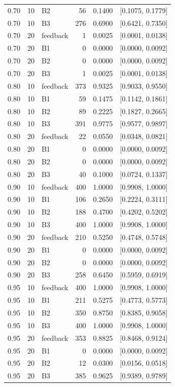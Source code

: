 \begin{longtable}{rrlrrl}
0.70 & 10 & B2 & 56 & 0.1400 & [0.1075, 0.1779]\\
0.70 & 10 & B3 & 276 & 0.6900 & [0.6421, 0.7350]\\
0.70 & 20 & feedback & 1 & 0.0025 & [0.0001, 0.0138]\\
0.70 & 20 & B1 & 0 & 0.0000 & [0.0000, 0.0092]\\
0.70 & 20 & B2 & 0 & 0.0000 & [0.0000, 0.0092]\\
0.70 & 20 & B3 & 1 & 0.0025 & [0.0001, 0.0138]\\
0.80 & 10 & feedback & 373 & 0.9325 & [0.9033, 0.9550]\\
0.80 & 10 & B1 & 59 & 0.1475 & [0.1142, 0.1861]\\
0.80 & 10 & B2 & 89 & 0.2225 & [0.1827, 0.2665]\\
0.80 & 10 & B3 & 391 & 0.9775 & [0.9577, 0.9897]\\
0.80 & 20 & feedback & 22 & 0.0550 & [0.0348, 0.0821]\\
0.80 & 20 & B1 & 0 & 0.0000 & [0.0000, 0.0092]\\
0.80 & 20 & B2 & 0 & 0.0000 & [0.0000, 0.0092]\\
0.80 & 20 & B3 & 40 & 0.1000 & [0.0724, 0.1337]\\
0.90 & 10 & feedback & 400 & 1.0000 & [0.9908, 1.0000]\\
0.90 & 10 & B1 & 106 & 0.2650 & [0.2224, 0.3111]\\
0.90 & 10 & B2 & 188 & 0.4700 & [0.4202, 0.5202]\\
0.90 & 10 & B3 & 400 & 1.0000 & [0.9908, 1.0000]\\
0.90 & 20 & feedback & 210 & 0.5250 & [0.4748, 0.5748]\\
0.90 & 20 & B1 & 0 & 0.0000 & [0.0000, 0.0092]\\
0.90 & 20 & B2 & 0 & 0.0000 & [0.0000, 0.0092]\\
0.90 & 20 & B3 & 258 & 0.6450 & [0.5959, 0.6919]\\
0.95 & 10 & feedback & 400 & 1.0000 & [0.9908, 1.0000]\\
0.95 & 10 & B1 & 211 & 0.5275 & [0.4773, 0.5773]\\
0.95 & 10 & B2 & 350 & 0.8750 & [0.8385, 0.9058]\\
0.95 & 10 & B3 & 400 & 1.0000 & [0.9908, 1.0000]\\
0.95 & 20 & feedback & 353 & 0.8825 & [0.8468, 0.9124]\\
0.95 & 20 & B1 & 0 & 0.0000 & [0.0000, 0.0092]\\
0.95 & 20 & B2 & 12 & 0.0300 & [0.0156, 0.0518]\\
0.95 & 20 & B3 & 385 & 0.9625 & [0.9389, 0.9789]\\
\end{longtable}
